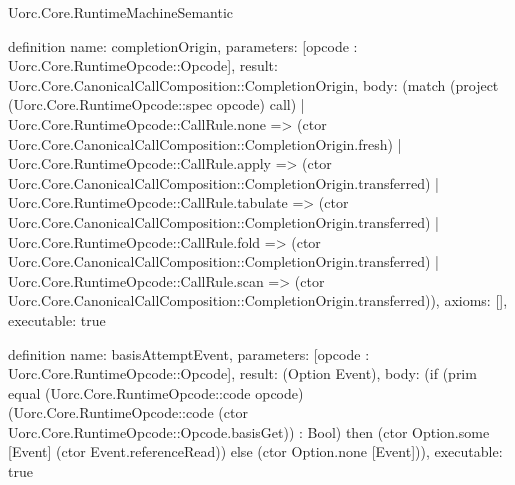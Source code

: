 \begin{lexlean}{Uorc.Core.RuntimeMachineSemantic}
\begin{semanticmodule}
definition{
  name: completionOrigin,
  parameters: [opcode : Uorc.Core.RuntimeOpcode::Opcode],
  result: Uorc.Core.CanonicalCallComposition::CompletionOrigin,
  body: (match (project (Uorc.Core.RuntimeOpcode::spec opcode) call)
    | Uorc.Core.RuntimeOpcode::CallRule.none => (ctor Uorc.Core.CanonicalCallComposition::CompletionOrigin.fresh)
    | Uorc.Core.RuntimeOpcode::CallRule.apply => (ctor Uorc.Core.CanonicalCallComposition::CompletionOrigin.transferred)
    | Uorc.Core.RuntimeOpcode::CallRule.tabulate => (ctor Uorc.Core.CanonicalCallComposition::CompletionOrigin.transferred)
    | Uorc.Core.RuntimeOpcode::CallRule.fold => (ctor Uorc.Core.CanonicalCallComposition::CompletionOrigin.transferred)
    | Uorc.Core.RuntimeOpcode::CallRule.scan => (ctor Uorc.Core.CanonicalCallComposition::CompletionOrigin.transferred)),
  axioms: [],
  executable: true
}

definition{
  name: basisAttemptEvent,
  parameters: [opcode : Uorc.Core.RuntimeOpcode::Opcode],
  result: (Option Event),
  body: (if (prim equal (Uorc.Core.RuntimeOpcode::code opcode) (Uorc.Core.RuntimeOpcode::code (ctor Uorc.Core.RuntimeOpcode::Opcode.basisGet)) : Bool) then (ctor Option.some [Event] (ctor Event.referenceRead)) else (ctor Option.none [Event])),
  executable: true
}
\end{semanticmodule}
\end{lexlean}
